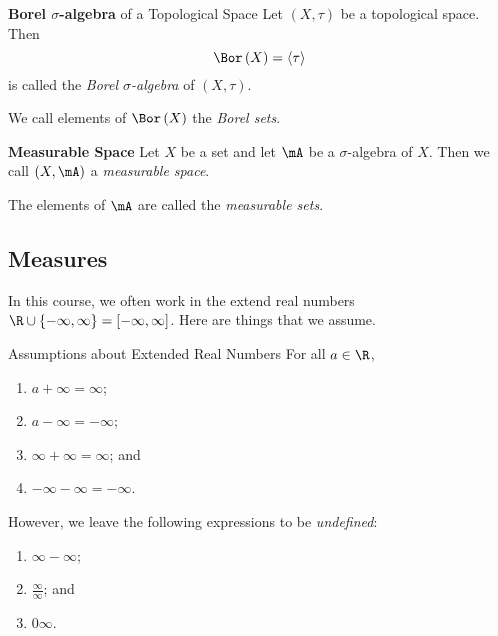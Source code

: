 \documentclass[pmath451]{subfiles}
\begin{document}
    \begin{definition}{\textbf{Borel $\sigma$-algebra} of a Topological Space}
        Let $\left( X,\tau \right)$ be a topological space. Then
        \begin{equation*}
            \Bor\left( X \right) = \left< \tau \right> 
        \end{equation*}
        is called the \emph{Borel $\sigma$-algebra} of $\left( X,\tau \right)$.

        We call elements of $\Bor\left( X \right)$ the \emph{Borel sets}.
    \end{definition}

    \begin{definition}{\textbf{Measurable Space}}
        Let $X$ be a set and let $\mA$ be a $\sigma$-algebra of $X$. Then we call $\left( X,\mA \right)$ a \emph{measurable space}.

        The elements of $\mA$ are called the \emph{measurable sets}.
    \end{definition}
    
    \subsection{Measures}
    
    \np In this course, we often work in the extend real numbers $\R\cup\left\lbrace -\infty,\infty \right\rbrace = \left[ -\infty,\infty \right]$. Here are things that we assume.

    \begin{assumption}{Assumptions about Extended Real Numbers}
        For all $a\in\R$,
        \begin{enumerate}
            \item $a+\infty = \infty$;
            \item $a-\infty = -\infty$;
            \item $\infty+\infty = \infty$; and
            \item $-\infty-\infty = -\infty$.
        \end{enumerate}
    \end{assumption}

    \clearpage
    \np However, we leave the following expressions to be \textit{undefined}:
    \begin{enumerate}
        \item $\infty-\infty$;
        \item $\frac{\infty}{\infty}$; and
        \item $0\infty$.
    \end{enumerate}
\end{document}
